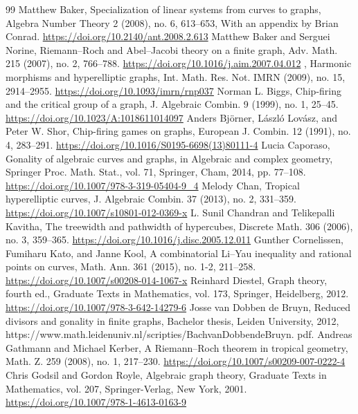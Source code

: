 \begin{thebibliography}{99}
 Matthew Baker, Specialization of linear systems from curves to graphs, Algebra Number Theory 2 (2008), no. 6, 613–653, With an appendix by Brian Conrad. \url{https://doi.org/10.2140/ant.2008.2.613}
 Matthew Baker and Serguei Norine, Riemann–Roch and Abel–Jacobi theory on a ﬁnite graph, Adv. Math. 215 (2007), no. 2, 766–788. \url{https://doi.org/10.1016/j.aim.2007.04.012}
 , Harmonic morphisms and hyperelliptic graphs, Int. Math. Res. Not. IMRN (2009), no. 15, 2914–2955. \url{https://doi.org/10.1093/imrn/rnp037}
 Norman L. Biggs, Chip-ﬁring and the critical group of a graph, J. Algebraic Combin. 9 (1999), no. 1, 25–45. \url{https://doi.org/10.1023/A:1018611014097}
 Anders Björner, László Lovász, and Peter W. Shor, Chip-ﬁring games on graphs, European J. Combin. 12 (1991), no. 4, 283–291. \url{https://doi.org/10.1016/S0195-6698(13)80111-4}
 Lucia Caporaso, Gonality of algebraic curves and graphs, in Algebraic and complex geometry, Springer Proc. Math. Stat., vol. 71, Springer, Cham, 2014, pp. 77–108. \url{https://doi.org/10.1007/978-3-319-05404-9_4}
 Melody Chan, Tropical hyperelliptic curves, J. Algebraic Combin. 37 (2013), no. 2, 331–359. \url{https://doi.org/10.1007/s10801-012-0369-x}
 L. Sunil Chandran and Telikepalli Kavitha, The treewidth and pathwidth of hypercubes, Discrete Math. 306 (2006), no. 3, 359–365. \url{https://doi.org/10.1016/j.disc.2005.12.011}
 Gunther Cornelissen, Fumiharu Kato, and Janne Kool, A combinatorial Li–Yau inequality and rational points on curves, Math. Ann. 361 (2015), no. 1-2, 211–258. \url{https://doi.org/10.1007/s00208-014-1067-x}
 Reinhard Diestel, Graph theory, fourth ed., Graduate Texts in Mathematics, vol. 173, Springer, Heidelberg, 2012. \url{https://doi.org/10.1007/978-3-642-14279-6}
 Josse van Dobben de Bruyn, Reduced divisors and gonality in ﬁnite graphs, Bachelor thesis, Leiden University, 2012, https://www.math.leidenuniv.nl/scripties/BachvanDobbendeBruyn. pdf. 
 Andreas Gathmann and Michael Kerber, A Riemann–Roch theorem in tropical geometry, Math. Z. 259 (2008), no. 1, 217–230. \url{https://doi.org/10.1007/s00209-007-0222-4}
 Chris Godsil and Gordon Royle, Algebraic graph theory, Graduate Texts in Mathematics, vol. 207, Springer-Verlag, New York, 2001. \url{https://doi.org/10.1007/978-1-4613-0163-9}

\end{thebibliography}
